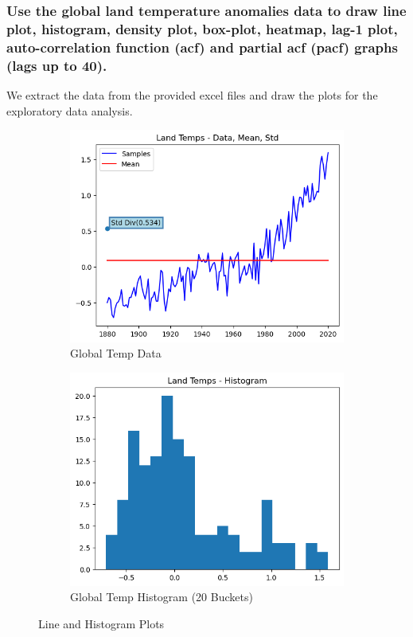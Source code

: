 \documentclass{article}
\begin{document}
\subsubsection{ Use the global land temperature anomalies data to draw line plot, histogram, density
 plot, box-plot, heatmap, lag-1 plot, auto-correlation function (acf) and partial acf
 (pacf) graphs (lags up to 40).}
We extract the data from the provided excel files and draw the plots for the exploratory data analysis.
 \begin{figure}[H]
  \centering
  \begin{subfigure}[b]{0.45\textwidth}
    \includegraphics[width=\textwidth]{img/global_temp/data.png}
    \caption{Global Temp Data}
    \label{fig:global_templines}
  \end{subfigure}
  \hfill
  \begin{subfigure}[b]{0.45\textwidth}
    \includegraphics[width=\textwidth]{img/global_temp/histogram.png}
    \caption{Global Temp Histogram (20 Buckets)}
    \label{fig:global_temphist}
  \end{subfigure}
  \caption{Line and Histogram Plots}
  \label{fig:global_temp1}
\end{figure}
\end{document}
